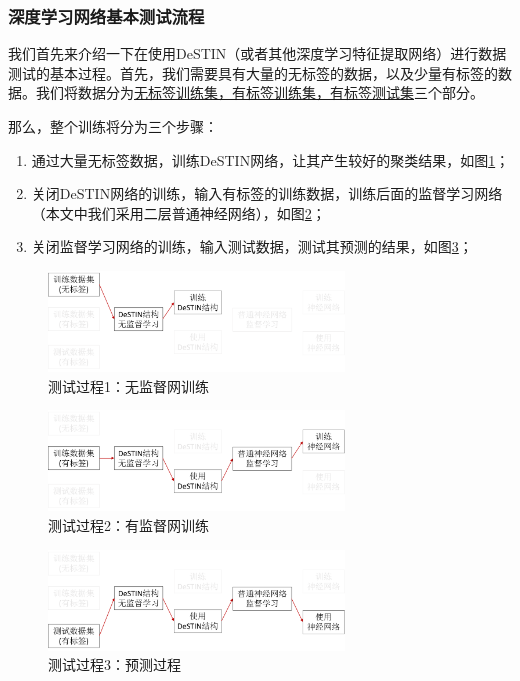 \subsubsection{深度学习网络基本测试流程}
我们首先来介绍一下在使用DeSTIN（或者其他深度学习特征提取网络）进行数据测试的基本过程。首先，我们需要具有大量的无标签的数据，以及少量有标签的数据。我们将数据分为\uline{无标签训练集，有标签训练集，有标签测试集}三个部分。

那么，整个训练将分为三个步骤：
\begin{enumerate}
\item 通过大量无标签数据，训练DeSTIN网络，让其产生较好的聚类结果，如图\ref{fig:step1}；
\item 关闭DeSTIN网络的训练，输入有标签的训练数据，训练后面的监督学习网络（本文中我们采用二层普通神经网络），如图\ref{fig:step2}；
\item 关闭监督学习网络的训练，输入测试数据，测试其预测的结果，如图\ref{fig:step3}；
\end{enumerate}

\begin{figure}[htbp]
   \centering
   \includegraphics[width=0.7\textwidth]{DeSTINStep1.png} %
   \caption{测试过程1：无监督网训练}
   \label{fig:step1}
\end{figure}

\begin{figure}[htbp]
   \centering
   \includegraphics[width=0.7\textwidth]{DeSTINStep2.png} %
   \caption{测试过程2：有监督网训练}
   \label{fig:step2}
\end{figure}

\begin{figure}[htbp]
   \centering
   \includegraphics[width=0.7\textwidth]{DeSTINStep3.png} %
   \caption{测试过程3：预测过程}
   \label{fig:step3}
\end{figure}


